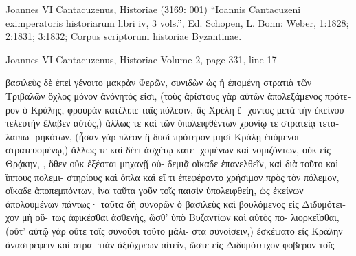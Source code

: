\documentclass[12pt,letterpaper,twoside,final]{memoir}
\begin{document}
\begin{greek}
Joannes VI Cantacuzenus, Historiae (3169: 001)
“Ioannis Cantacuzeni eximperatoris historiarum libri iv, 3 vols.”, Ed. Schopen, L.
Bonn: Weber, 1:1828; 2:1831; 3:1832; Corpus scriptorum historiae Byzantinae.

Joannes VI Cantacuzenus, Historiae 
Volume 2, page 331, line 17

          βασιλεὺς δὲ ἐπεὶ γένοιτο μακρὰν Φερῶν, συνιδὼν 
ὡς ἡ ἑπομένη στρατιὰ τῶν Τριβαλῶν ὄχλος μόνον ἀνόνητός 
εἰσι, (τοὺς ἀρίστους γὰρ αὐτῶν ἀπολεξάμενος πρότερον 
ὁ Κράλης, φρουρὰν κατέλιπε ταῖς πόλεσιν, ἃς Χρέλη ἔ-
χοντος μετὰ τὴν ἐκείνου τελευτὴν ἔλαβεν αὐτὸς,) ἄλλως 
τε καὶ τῶν ὑπολειφθέντων χρονίῳ τε στρατείᾳ τεταλαιπω-
ρηκότων, (ἦσαν γὰρ πλέον ἢ δυσὶ πρότερον μησὶ Κράλῃ 
ἑπόμενοι στρατευομένῳ,) ἄλλως τε καὶ δέει ἀσχέτῳ κατε-
χομένων καὶ νομιζόντων, οὐκ εἰς Θρᾴκην, , ὅθεν οὐκ ἐξέσται μηχανῇ οὐ-
δεμιᾷ οἴκαδε ἐπανελθεῖν, καὶ διὰ τοῦτο καὶ ἵππους πολεμι-
στηρίους καὶ ὅπλα καὶ εἴ τι ἐπεφέροντο χρήσιμον πρὸς τὸν 
πόλεμον, οἴκαδε ἀποπεμπόντων, ἵνα ταῦτα γοῦν τοῖς παισὶν 
ὑπολειφθείη, ὡς ἐκείνων ἀπολουμένων πάντως· ταῦτα δὴ 
συνορῶν ὁ βασιλεὺς καὶ βουλόμενος εἰς Διδυμότειχον μὴ οὕ-
τως ἀφικέσθαι ἀσθενὴς, ὥσθ' ὑπὸ Βυζαντίων καὶ αὐτὸς πο-
λιορκεῖσθαι, (οὔτ' αὐτῷ γὰρ οὔτε τοῖς συνοῦσι τοῦτο μάλι-  
στα συνοίσειν,) ἐσκέψατο εἰς Κράλην ἀναστρέφειν καὶ στρα-
τιὰν ἀξιόχρεων αἰτεῖν, ὥστε εἰς Διδυμότειχον φοβερὸν τοῖς 

\end{greek}
\end{document}
